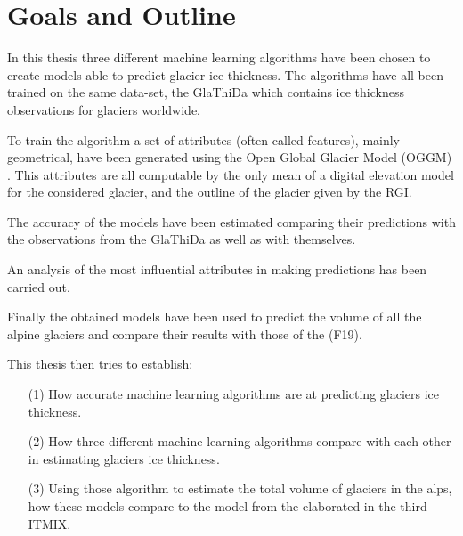 \section{Goals and Outline}\label{goals}
In this thesis three different machine learning algorithms have been chosen to  create models able to predict glacier ice thickness. The algorithms have all been trained on the same data-set, the GlaThiDa which contains ice thickness observations for glaciers worldwide.

To train the algorithm a set of attributes (often called features), mainly geometrical, have been generated using the Open Global Glacier Model (OGGM) \citep{OGGM2019}. This attributes are all computable by the only mean of a digital elevation model for the considered glacier, and the outline of the glacier given by the RGI.

The accuracy of the models have been estimated comparing their predictions with the observations from the GlaThiDa as well as with themselves.

An analysis of the most influential attributes in making predictions has been carried out.

Finally the obtained models have been used to predict the volume of all the alpine glaciers and compare their results with those of the \citet{Farinotti2019} (F19).


This thesis then tries to establish:
\begin{itemize}
\item[(1)] How accurate machine learning algorithms are at predicting glaciers ice thickness.
\item[(2)] How three different machine learning algorithms compare with each other in estimating glaciers ice thickness.
\item[(3)] Using those algorithm to estimate the total volume of glaciers in the alps, how these models compare to the model from the \cite{Farinotti2019} elaborated in the third ITMIX.
\end{itemize}

%
%
